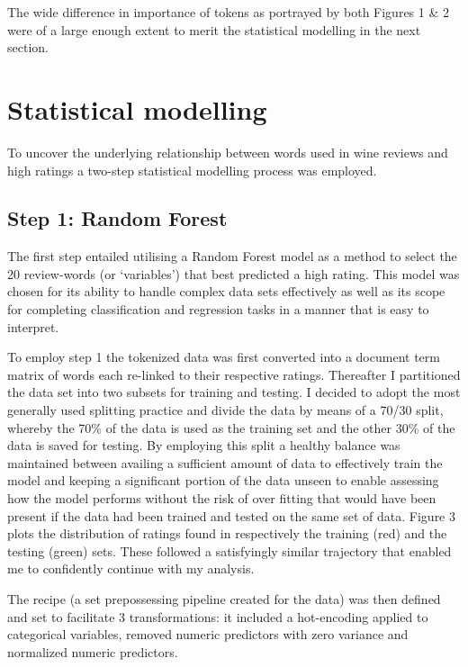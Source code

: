 \documentclass[11pt,preprint]{elsarticle}
\numberwithin{equation}{section}
\numberwithin{figure}{section}
\numberwithin{table}{section}
\begin{document}
The wide difference in importance of tokens as portrayed by both Figures
1 \& 2 were of a large enough extent to merit the statistical modelling
in the next section.

\newpage

\section{Statistical modelling}\label{statistical-modelling}

\label{StatMod} To uncover the underlying relationship between words
used in wine reviews and high ratings a two-step statistical modelling
process was employed.

\subsection{Step 1: Random Forest}\label{step-1-random-forest}

The first step entailed utilising a Random Forest model as a method to
select the 20 review-words (or `variables') that best predicted a high
rating. This model was chosen for its ability to handle complex data
sets effectively as well as its scope for completing classification and
regression tasks in a manner that is easy to interpret.

To employ step 1 the tokenized data was first converted into a document
term matrix of words each re-linked to their respective ratings.
Thereafter I partitioned the data set into two subsets for training and
testing. I decided to adopt the most generally used splitting practice
and divide the data by means of a 70/30 split, whereby the 70\% of the
data is used as the training set and the other 30\% of the data is saved
for testing. By employing this split a healthy balance was maintained
between availing a sufficient amount of data to effectively train the
model and keeping a significant portion of the data unseen to enable
assessing how the model performs without the risk of over fitting that
would have been present if the data had been trained and tested on the
same set of data. Figure 3 plots the distribution of ratings found in
respectively the training (red) and the testing (green) sets. These
followed a satisfyingly similar trajectory that enabled me to
confidently continue with my analysis.

The recipe (a set prepossessing pipeline created for the data) was then
defined and set to facilitate 3 transformations: it included a
hot-encoding applied to categorical variables, removed numeric
predictors with zero variance and normalized numeric predictors.
\end{document}
